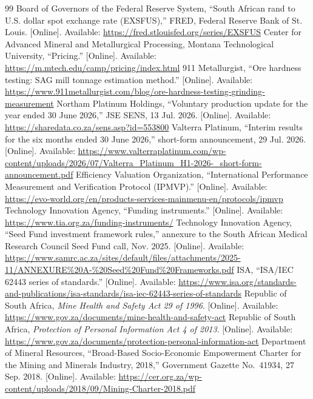 \documentclass[10pt,a4paper,twocolumn]{article}
\begin{document}
\begin{thebibliography}{99}
 Board of Governors of the Federal Reserve System, ``South African rand to U.S. dollar spot exchange rate (EXSFUS),'' FRED, Federal Reserve Bank of St. Louis. [Online]. Available: \url{https://fred.stlouisfed.org/series/EXSFUS}
 Center for Advanced Mineral and Metallurgical Processing, Montana Technological University, ``Pricing.'' [Online]. Available: \url{https://m.mtech.edu/camp/pricing/index.html}
 911 Metallurgist, ``Ore hardness testing: SAG mill tonnage estimation method.'' [Online]. Available: \url{https://www.911metallurgist.com/blog/ore-hardness-testing-grinding-measurement}
 Northam Platinum Holdings, ``Voluntary production update for the year ended 30 June 2026,'' JSE SENS, 13 Jul. 2026. [Online]. Available: \url{https://sharedata.co.za/sens.asp?id=553800}
 Valterra Platinum, ``Interim results for the six months ended 30 June 2026,'' short-form announcement, 29 Jul. 2026. [Online]. Available: \url{https://www.valterraplatinum.com/wp-content/uploads/2026/07/Valterra_Platinum_H1-2026-_short-form-announcement.pdf}
 Efficiency Valuation Organization, ``International Performance Measurement and Verification Protocol (IPMVP).'' [Online]. Available: \url{https://evo-world.org/en/products-services-mainmenu-en/protocols/ipmvp}
 Technology Innovation Agency, ``Funding instruments.'' [Online]. Available: \url{https://www.tia.org.za/funding-instruments/}
 Technology Innovation Agency, ``Seed Fund investment framework rules,'' annexure to the South African Medical Research Council Seed Fund call, Nov. 2025. [Online]. Available: \url{https://www.samrc.ac.za/sites/default/files/attachments/2025-11/ANNEXURE\%20A-\%20Seed\%20Fund\%20Frameworks.pdf}
 ISA, ``ISA/IEC 62443 series of standards.'' [Online]. Available: \url{https://www.isa.org/standards-and-publications/isa-standards/isa-iec-62443-series-of-standards}
 Republic of South Africa, \emph{Mine Health and Safety Act 29 of 1996}. [Online]. Available: \url{https://www.gov.za/documents/mine-health-and-safety-act}
 Republic of South Africa, \emph{Protection of Personal Information Act 4 of 2013}. [Online]. Available: \url{https://www.gov.za/documents/protection-personal-information-act}
 Department of Mineral Resources, ``Broad-Based Socio-Economic Empowerment Charter for the Mining and Minerals Industry, 2018,'' Government Gazette No.~41934, 27 Sep. 2018. [Online]. Available: \url{https://cer.org.za/wp-content/uploads/2018/09/Mining-Charter-2018.pdf}

\end{thebibliography}
\end{document}
